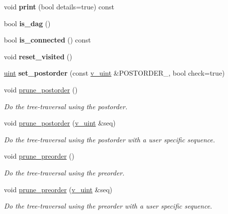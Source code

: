 \begin{DoxyCompactItemize}
void {\bfseries print} (bool details=true) const
\item 
\mbox{\label{classpruner_1_1Tree_af793b391043a88ceea805b584efb982a}} 
bool {\bfseries is\+\_\+dag} ()
\item 
\mbox{\label{classpruner_1_1Tree_a35f8e571cf8a21c0fcf43805f7bc6c00}} 
bool {\bfseries is\+\_\+connected} () const
\item 
\mbox{\label{classpruner_1_1Tree_a3ff712c25817e2bb3d1a87baef7b87d0}} 
void {\bfseries reset\+\_\+visited} ()
\item 
\mbox{\label{classpruner_1_1Tree_a2de0f68a5de9083a4ff21b54d567fb1a}} 
\hyperlink{namespacepruner_a659e6e64a9e2b8e981c3d34262a2f67e}{uint} {\bfseries set\+\_\+postorder} (const \hyperlink{namespacepruner_af0145646bd7ede012cd336b416bc5579}{v\+\_\+uint} \&P\+O\+S\+T\+O\+R\+D\+E\+R\+\_\+, bool check=true)
\item 
void \hyperlink{classpruner_1_1Tree_a7d465880d18acf79f3a772ea5412b0d7}{prune\+\_\+postorder} ()
\begin{DoxyCompactList}\small\item\em Do the tree-\/traversal using the postorder. \end{DoxyCompactList}\item 
void \hyperlink{classpruner_1_1Tree_a8318027f3d2b1a07bf25e813c7c80056}{prune\+\_\+postorder} (\hyperlink{namespacepruner_af0145646bd7ede012cd336b416bc5579}{v\+\_\+uint} \&seq)
\begin{DoxyCompactList}\small\item\em Do the tree-\/traversal using the postorder with a user specific sequence. \end{DoxyCompactList}\item 
void \hyperlink{classpruner_1_1Tree_ac85bfb083b3856e65987e1d15885a61c}{prune\+\_\+preorder} ()
\begin{DoxyCompactList}\small\item\em Do the tree-\/traversal using the preorder. \end{DoxyCompactList}\item 
void \hyperlink{classpruner_1_1Tree_a6841109c7ff37bcabdf3a4d79009ad21}{prune\+\_\+preorder} (\hyperlink{namespacepruner_af0145646bd7ede012cd336b416bc5579}{v\+\_\+uint} \&seq)
\begin{DoxyCompactList}\small\item\em Do the tree-\/traversal using the preorder with a user specific sequence. \end{DoxyCompactList}\end{DoxyCompactItemize}
